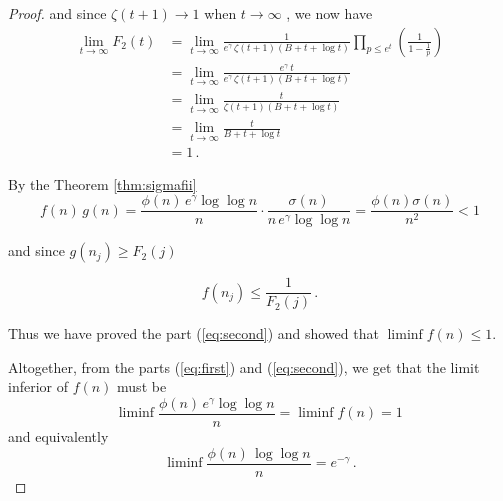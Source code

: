 \documentclass{article}
\begin{document}
\begin{theorem}
\begin{proof}
and since $\zeta(t+1)\rightarrow 1$ when $t\rightarrow\infty$ \cite{HardyWright}, we now have
\begin{align*}
    \lim_{t \rightarrow \infty} F_2(t) & = \lim_{t \rightarrow \infty} \frac{1}{e^\gamma\,\zeta(t+1)(B+t+\log t)} \prod_{p\leq e^t} \left(\frac{1}{1-\frac{1}{p}}\right)\\
    & = \lim_{t \rightarrow \infty} \frac{e^\gamma\,t}{e^\gamma\,\zeta(t+1)(B+t+\log t)}\\
    & = \lim_{t \rightarrow \infty} \frac{t}{\zeta(t+1)(B+t+\log t)}\\
    & = \lim_{t \rightarrow \infty} \frac{t}{B+t+\log t}\\
    & = 1\,.
\end{align*}

By the Theorem \ref{thm:sigmafii}
\begin{equation*}
    f(n)\,g(n) = \frac{\phi(n)\,e^\gamma \log\log n}{n} \cdot \frac{\sigma(n)}{n\,e^\gamma \log\log n} = \frac{\phi(n)\sigma(n)}{n^2}<1
\end{equation*}

and since $g(n_j) \geq F_2(j)$

\begin{equation*}
    f(n_j)\leq \frac{1}{F_2(j)}\,.
\end{equation*}

Thus we have proved the part (\ref{eq:second}) and showed that $\liminf{f(n)\leq 1}$.

Altogether, from the parts (\ref{eq:first}) and (\ref{eq:second}), we get that the limit inferior of $f(n)$ must be
\begin{equation*}
    \liminf{\frac{\phi(n)\,e^\gamma \log\log n}{n}}=\liminf{f(n)}=1\,
\end{equation*}
and equivalently
\begin{equation*}
    \liminf{\frac{\phi(n)\,\log\log n}{n}}=e^{-\gamma}\,.
\end{equation*}

\end{proof}

\end{theorem}

\clearpage
\nocite{*}
\printbibliography
\end{document}
